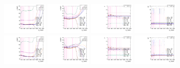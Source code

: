 \begin{figure}[htbp]
  \includegraphics[width=0.2\textwidth]{fig/2Dfit/paramSignalShape_allSig_MJJ_HP_nobb_HDy_mean.pdf}
  \includegraphics[width=0.2\textwidth]{fig/2Dfit/paramSignalShape_allSig_MJJ_HP_nobb_HDy_sigma.pdf}
  \includegraphics[width=0.2\textwidth]{fig/2Dfit/paramSignalShape_allSig_MJJ_HP_nobb_HDy_alpha.pdf}
  \includegraphics[width=0.2\textwidth]{fig/2Dfit/paramSignalShape_allSig_MJJ_HP_nobb_HDy_alpha2.pdf}\\
  \includegraphics[width=0.2\textwidth]{fig/2Dfit/paramSignalShape_allSig_MJJ_LP_nobb_HDy_mean.pdf}
  \includegraphics[width=0.2\textwidth]{fig/2Dfit/paramSignalShape_allSig_MJJ_LP_nobb_HDy_sigma.pdf}
  \includegraphics[width=0.2\textwidth]{fig/2Dfit/paramSignalShape_allSig_MJJ_LP_nobb_HDy_alpha.pdf}
  \includegraphics[width=0.2\textwidth]{fig/2Dfit/paramSignalShape_allSig_MJJ_LP_nobb_HDy_alpha2.pdf}\\

\end{figure}
